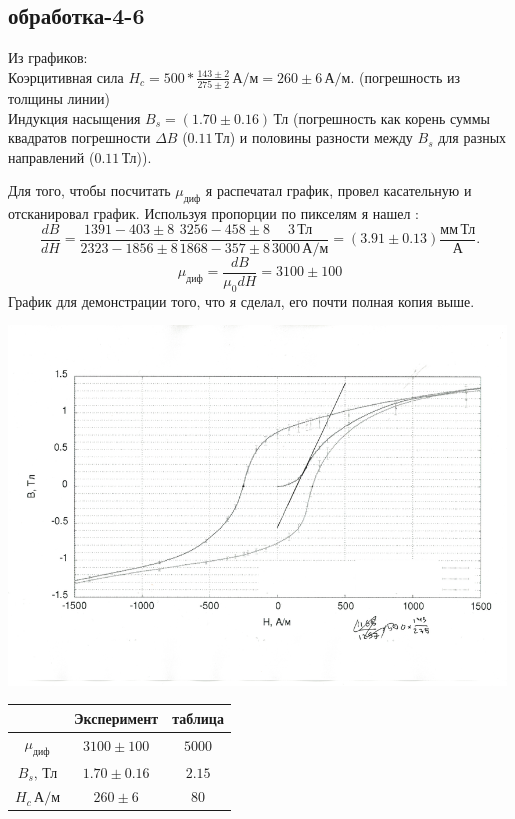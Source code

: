 \subsection{обработка-4-6}

Из графиков:\\
Коэрцитивная сила $H_{c}=500*\frac{143\pm2}{275\pm2}\,\text{А}/\text{м} = 260\pm6\,\text{А}/\text{м}.$ (погрешность из толщины линии)\\
Индукция насыщения $B_s = (1.70\pm0.16)\,\text{Тл}$ (погрешность как корень суммы квадратов погрешности $\Delta B$ ($0.11\,\text{Тл}$) и половины разности между $B_s$ для разных направлений ($0.11\,\text{Тл}$)).

Для того, чтобы посчитать $\mu_\text{диф}$ я распечатал график, провел касательную и отсканировал график. Используя пропорции по пикселям я нашел :
$$\frac{dB}{dH} = \frac{1391-403\pm8}{2323-1856\pm8}\frac{3256-458\pm8}{1868-357\pm8}\frac{3\,\text{Тл}}{3000\,\text{А}/\text{м}} = (3.91\pm0.13) \frac{\text{мм}\,\text{Тл}}{\text{А}}.$$
$$\mu_\text{диф} = \frac{dB}{\mu_0dH} = 3100\pm100$$
График для демонстрации того, что я сделал, его почти полная копия выше.
\begin{center}
\includegraphics[width=0.99\textwidth]{6_res.png}
\end{center}

\begin{center}
\begin{tabular}{|c|c|c|}
\hline
&Эксперимент&таблица\\\hline
$\mu_\text{диф}$&$3100\pm100$&$5000$\\\hline
$B_s,\,\text{Тл}$&$1.70\pm0.16$&$2.15$\\\hline
$H_{c}\,\text{А}/\text{м}$&$260\pm6$&$80$\\\hline
\end{tabular}
\end{center}
